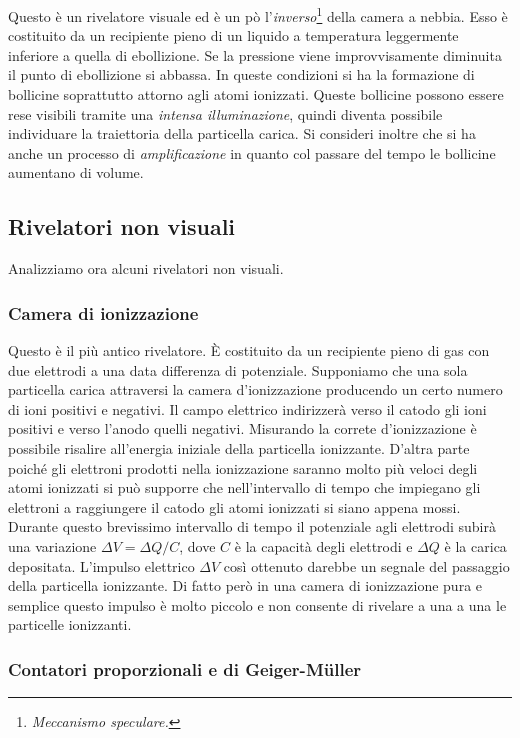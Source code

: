 Questo è un rivelatore visuale ed è un pò 
l'\textit{inverso}\footnote{\textit{Meccanismo speculare.} } della camera a 
nebbia. Esso è costituito da un recipiente pieno di un liquido a temperatura 
leggermente inferiore a quella di ebollizione. Se la pressione viene 
improvvisamente diminuita il punto di ebollizione si abbassa. In queste 
condizioni si ha la formazione di bollicine soprattutto attorno agli atomi 
ionizzati. Queste bollicine possono essere rese visibili tramite una 
\textit{intensa illuminazione}, quindi diventa possibile individuare la 
traiettoria della particella carica. Si consideri inoltre che si ha anche un 
processo di \textit{amplificazione} in quanto col passare del tempo le 
bollicine aumentano di volume.

\subsection{Rivelatori non visuali}
Analizziamo ora alcuni rivelatori non visuali.
\subsubsection{Camera di ionizzazione}

Questo è il più antico rivelatore. È costituito da un recipiente pieno di 
gas con due elettrodi a una data differenza di potenziale. Supponiamo che una 
sola particella carica attraversi la camera d'ionizzazione producendo un certo 
numero di ioni positivi e negativi. Il campo elettrico indirizzerà verso il 
catodo gli ioni positivi e verso l'anodo quelli negativi. Misurando la correte 
d'ionizzazione è possibile risalire all'energia iniziale della particella 
ionizzante. D'altra parte poiché gli elettroni prodotti nella ionizzazione 
saranno molto più veloci degli atomi ionizzati si può supporre che 
nell'intervallo di tempo che impiegano gli elettroni a raggiungere il catodo 
gli atomi ionizzati si siano appena mossi. Durante questo brevissimo intervallo 
di tempo il potenziale agli elettrodi subirà una variazione $\Delta V = \Delta 
Q / C$, dove $C$ è la capacità degli elettrodi e $\Delta Q$ è la carica 
depositata. L'impulso elettrico $\Delta V$ così ottenuto darebbe un segnale 
del passaggio della particella ionizzante. Di fatto però in una camera di 
ionizzazione pura e semplice questo impulso è molto piccolo e non consente di 
rivelare a una a una le particelle ionizzanti.

\subsubsection{Contatori proporzionali e di Geiger-M\"uller}

